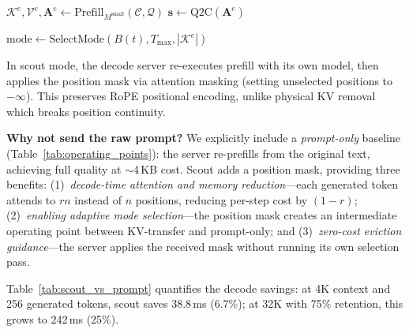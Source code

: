 \documentclass{article}
\begin{document}
\begin{algorithm}[t]
\caption{Scout Protocol}
\label{alg:scout}
\SetAlgoLined
{}

$\mathcal{K}^e, \mathcal{V}^e, \mathbf{A}^e \leftarrow \text{Prefill}_{M^{\text{small}}}(\mathcal{C}, \mathcal{Q})$\;
$\mathbf{s} \leftarrow \text{Q2C}(\mathbf{A}^e)$ 

$\text{mode} \leftarrow \text{SelectMode}(B(t), T_{\max}, |\mathcal{K}^e|)$\;

\end{algorithm}

In scout mode, the decode server re-executes prefill with its own model, then applies the position mask via attention masking (setting unselected positions to $-\infty$).
This preserves RoPE positional encoding, unlike physical KV removal which breaks position continuity.

\textbf{Why not send the raw prompt?}
We explicitly include a \emph{prompt-only} baseline (Table~\ref{tab:operating_points}): the server re-prefills from the original text, achieving full quality at $\sim$4\,KB cost.
Scout adds a position mask, providing three benefits: (1)~\emph{decode-time attention and memory reduction}---each generated token attends to $rn$ instead of $n$ positions, reducing per-step cost by $(1{-}r)$; (2)~\emph{enabling adaptive mode selection}---the position mask creates an intermediate operating point between KV-transfer and prompt-only; and (3)~\emph{zero-cost eviction guidance}---the server applies the received mask without running its own selection pass.

Table~\ref{tab:scout_vs_prompt} quantifies the decode savings: at 4K context and 256 generated tokens, scout saves 38.8\,ms (6.7\%); at 32K with 75\% retention, this grows to 242\,ms (25\%).
\end{document}
